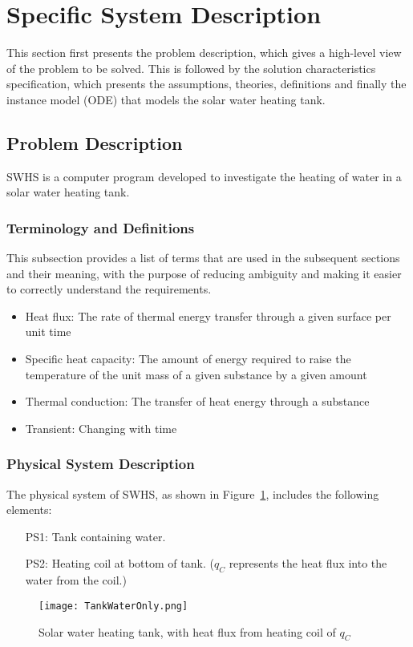 \documentclass[12pt]{article}
\begin{document}
\section{Specific System Description}
\label{Sec:SpecSystDesc}
This section first presents the problem description, which gives a high-level view of the problem to be solved. This is followed by the solution characteristics specification, which presents the assumptions, theories, definitions and finally the instance model (ODE) that models the solar water heating tank.
\subsection{Problem Description}
\label{Sec:ProbDesc}
SWHS is a computer program developed to investigate the heating of water in a solar water heating tank.
\subsubsection{Terminology and Definitions}
\label{Sec:TermDefs}
This subsection provides a list of terms that are used in the subsequent sections and their meaning, with the purpose of reducing ambiguity and making it easier to correctly understand the requirements.
\begin{itemize}
\item{Heat flux: The rate of thermal energy transfer through a given surface per unit time}
\item{Specific heat capacity: The amount of energy required to raise the temperature of the unit mass of a given substance by a given amount}
\item{Thermal conduction: The transfer of heat energy through a substance}
\item{Transient: Changing with time}
\end{itemize}
\subsubsection{Physical System Description}
\label{Sec:PhysSyst}
The physical system of SWHS, as shown in Figure~\ref{Figure:Tank}, includes the following elements:
\begin{itemize}
\item[PS1:]Tank containing water.
\item[PS2:]Heating coil at bottom of tank. (${q_{C}}$ represents the heat flux into the water from the coil.)
\end{itemize}
\begin{figure}
\begin{center}
\texttt{[image: TankWaterOnly.png]}
\caption{Solar water heating tank, with heat flux from heating coil of ${q_{C}}$}
\label{Figure:Tank}
\end{center}
\end{figure}
\end{document}
